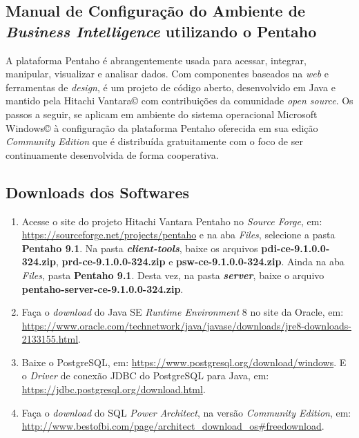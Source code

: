 \begin{apendicesenv}

\partapendices

\chapter{Manual de Configuração do Ambiente de \textit{Business Intelligence} utilizando o Pentaho}


A plataforma Pentaho é abrangentemente usada para acessar, integrar, manipular, visualizar e analisar dados. Com componentes baseados na \textit{web} e ferramentas de \textit{design}, é um projeto de código aberto, desenvolvido em Java e mantido pela Hitachi Vantara© com contribuições da comunidade \textit{open source}. Os passos a seguir, se aplicam em ambiente do sistema operacional Microsoft Windows© à configuração da plataforma Pentaho oferecida em sua edição \textit{Community Edition} que é distribuída gratuitamente com o foco de ser continuamente desenvolvida de forma cooperativa. 

\section{Downloads dos Softwares}

\begin{enumerate}
   \item Acesse o site do projeto Hitachi Vantara Pentaho no \textit{Source Forge}, em: \url{https://sourceforge.net/projects/pentaho} e na aba \textit{Files}, selecione a pasta \textbf{Pentaho 9.1}. Na pasta \textbf{\textit{client-tools}}, baixe os arquivos \textbf{pdi-ce-9.1.0.0-324.zip}, \textbf{prd-ce-9.1.0.0-324.zip} e \textbf{psw-ce-9.1.0.0-324.zip}. Ainda na aba \textit{Files}, pasta \textbf{Pentaho 9.1}. Desta vez, na pasta \textbf{\textit{server}}, baixe o arquivo \textbf{pentaho-server-ce-9.1.0.0-324.zip}.
   \item Faça o \textit{download} do Java SE \textit{Runtime Environment} 8 no site da Oracle, em: \url{https://www.oracle.com/technetwork/java/javase/downloads/jre8-downloads-2133155.html}.
   \item Baixe o PostgreSQL, em: \url{https://www.postgresql.org/download/windows}. E o \textit{Driver} de conexão JDBC do PostgreSQL para Java, em: \url{https://jdbc.postgresql.org/download.html}.
   \item Faça o \textit{download} do SQL \textit{Power Architect}, na versão \textit{Community Edition}, em: \url{http://www.bestofbi.com/page/architect_download_os#freedownload}.
\end{enumerate}


\end{apendicesenv}
